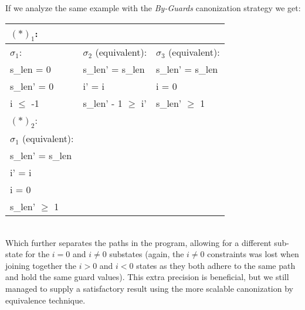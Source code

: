 If we analyze the same example with the \emph{By-Guards} canonization strategy we get:
\\
\begin{tabular}{l|l|l}
$(*)_1$:
\\ \hline
$\sigma_1$:     & $\sigma_2$ (equivalent):  & $\sigma_3$ (equivalent):
\\ \hline
s\_len = 0      & s\_len' = s\_len          & s\_len' = s\_len
\\
s\_len' = 0     & i' = i                    & i = 0
\\
i $\leq$ -1     & s\_len' - 1 $\geq$ i'     & s\_len' $\geq$ 1
\\ \hline
$(*)_2$:
\\ \hline
$\sigma_1$ (equivalent):
\\ \hline
s\_len' = s\_len
\\
i' = i
\\
i = 0
\\
s\_len' $\geq$ 1
\\ \hline
\end{tabular}
\\
Which further separates the paths in the program, allowing for a different sub-state for the $i = 0$ and $i \neq 0$ substates (again, the $i \neq 0$ constraints was lost when joining together the $i > 0$ and $i < 0$ states as they both adhere to the same path and hold the same guard values). This extra precision is beneficial, but we still managed to supply a satisfactory result using the more scalable canonization by equivalence technique.




